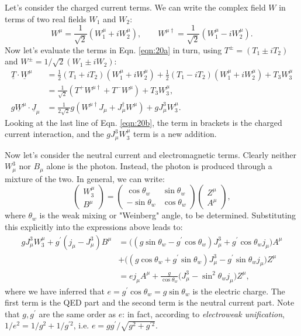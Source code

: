 Let's consider the charged current terms. We can write the complex field $W$ in terms of two real fields $W_1$ and $W_2$:
\begin{equation}
W^\mu = \frac{1}{\sqrt{2}} (W_1^\mu + i W_2^\mu), \qquad W^{\mu \dagger} = \frac{1}{\sqrt{2}} (W_1^\mu - i W_2^\mu).
\end{equation}
Now let's evaluate the terms in Eqn. \ref{eqn:20a} in turn, using $T^\pm = (T_1 \pm iT_2)$ and $W^\pm = 1/\sqrt{2}(W_1 \pm iW_2)$:
\begin{equation} \label{eqn:20b}
\begin{split}
\underline{T} \cdot \underline{W}^\mu &= \frac{1}{2} (T_1 + i T_2) (W_1^\mu + i W_2^\mu) + \frac{1}{2} (T_1 - i T_2)(W_1^\mu + i W_2^\mu) + T_3 W_3^\mu \\
&= \frac{1}{\sqrt{2}} (T^+ W^{\mu \dagger} + T^- W^\mu) + T_3 W_3^\mu,\\
g \underline{W}^\mu \cdot \underline{J}_\mu &= \frac{1}{2 \sqrt{2}} g(W^{\mu \dagger} J_\mu + J_\mu^\dagger W^\mu) + gJ_\mu^3 W_3^\mu.
\end{split}
\end{equation}
Looking at the last line of Eqn. \ref{eqn:20b}, the term in brackets is the charged current interaction, and the $gJ_\mu^3 W_3^\mu$ term is a new addition. 

Now let's consider the neutral current and electromagnetic terms. Clearly neither $W_\mu^3$ nor $B_\mu$ alone is the photon. Instead, the photon is produced through a mixture of the two. In general, we can write:
\[\left( \begin{array}{cc}
W^\mu_3 \\
B^\mu 
\end{array} \right) =
 \left( \begin{array}{cc}
\cos\theta_w & \sin\theta_w  \\
-\sin\theta_w & \cos\theta_w  \end{array} \right) 
\left( \begin{array}{cc}
Z^\mu \\
A^\mu 
\end{array} \right), \]
where $\theta_w$ is the weak mixing or "Weinberg" angle, to be determined. Substituting this explicitly into the expressions above leads to:
\begin{equation}
\begin{split}
gJ_\mu^3W_3^\mu + g^\prime(j_\mu - J_\mu^3)B^\mu &= \bigg((g\sin\theta_w - g^\prime \cos\theta_w)J_\mu^3 + g^\prime \cos\theta_wj_\mu\bigg)A^\mu \\
&+ \bigg((g\cos\theta_w + g^\prime \sin\theta_w)J_\mu^3 - g^\prime \sin\theta_w j_\mu\bigg)Z^\mu \\
&= ej_\mu A^\mu + \frac{g}{\cos\theta_w}\bigg(J_\mu^3 - \sin^2\theta_w j_\mu \bigg)Z^\mu,
\end{split}
\end{equation}
where we have inferred that $e = g^\prime \cos\theta_w = g \sin\theta_w$ is the electric charge. The first term is the QED part and the second term is the neutral current part. Note that $g, g^\prime$ are the same order as $e$: in fact, according to \textit{electroweak unification}, $1/e^2 = 1/g^2 + 1/g^{\prime 2}$, i.e. $e = g g^\prime/\sqrt{g^2 + g^{\prime 2}}$.

